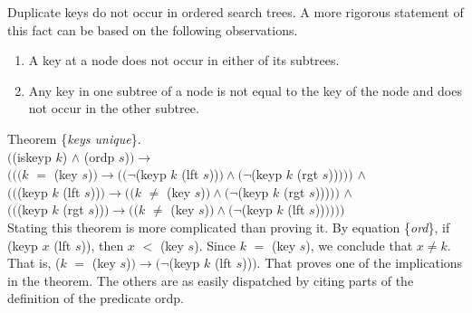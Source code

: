 Duplicate keys do not occur in ordered search trees.
A more rigorous statement of this fact can be based on
the following observations.
\begin{enumerate}
\item A key at a node does not occur in either of its subtrees.
\item Any key in one subtree of a node is not equal to the key of the node
      and does not occur in the other subtree.
\end{enumerate}
\label{thm:keys-unique}
Theorem \{\emph{keys unique}\}. \\
$($\textsf{(iskeyp $k$)} $\wedge$ \textsf{(ordp $s$)}$) \rightarrow$ \\
$(((k$ $=$ \textsf{(key $s$)}$) \rightarrow ((\neg$\textsf{(keyp $k$ (lft $s$))}$) \wedge (\neg$\textsf{(keyp $k$ (rgt $s$))}$)))$ $\wedge$ \\
\hspace*{1.5mm}$(($\textsf{(keyp $k$ (lft $s$))}$) \rightarrow ((k$ $\ne$ \textsf{(key $s$)}$) \wedge (\neg$\textsf{(keyp $k$ (rgt $s$)}))$))$ $\wedge$ \\
\hspace*{1.5mm}$(($\textsf{(keyp $k$ (rgt $s$))}$) \rightarrow ((k$ $\ne$ \textsf{(key $s$)}$) \wedge (\neg$(\textsf{keyp $k$ (lft $s$))}$))))$ \\

Stating this theorem is more complicated than proving it.
By equation \{\emph{ord}\}, if \textsf{(keyp $x$ (lft $s$))}, then $x$ $<$ \textsf{(key $s$)}.
Since $k$ $=$ \textsf{(key $s$)}, we conclude that $x \neq k$.
That is, ($k$ $=$ \textsf{(key $s$)}$) \rightarrow (\neg$\textsf{(keyp $k$ (lft $s$))}$)$.
That proves one of the implications in the theorem.
The others are as easily dispatched by citing parts
of the definition of the predicate \textsf{ordp}.

\begin{exercises}

\end{exercises}

